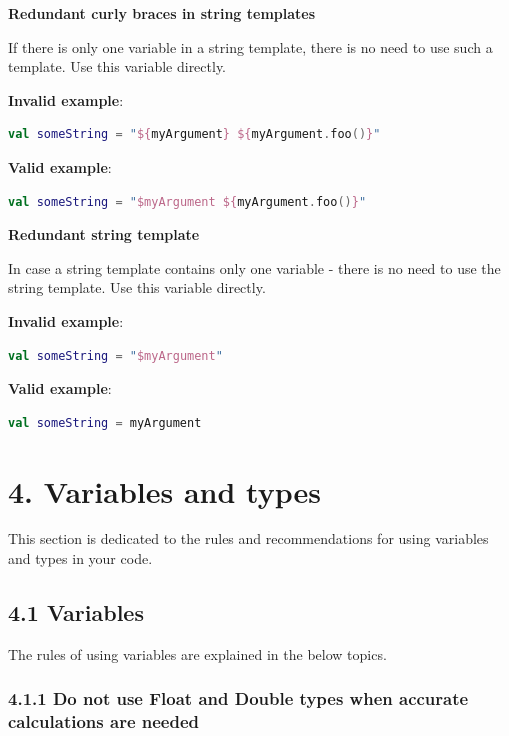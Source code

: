 {{{{\textbf{Redundant curly braces in string templates}



If there is only one variable in a string template, there is no need to use such a template. Use this variable directly.

\textbf{Invalid example}:

\begin{lstlisting}[language=Kotlin]
val someString = "${myArgument} ${myArgument.foo()}"
\end{lstlisting}


\textbf{Valid example}:

\begin{lstlisting}[language=Kotlin]
val someString = "$myArgument ${myArgument.foo()}"
\end{lstlisting}


\textbf{Redundant string template}



In case a string template contains only one variable - there is no need to use the string template. Use this variable directly.



\textbf{Invalid example}:

\begin{lstlisting}[language=Kotlin]
val someString = "$myArgument"
\end{lstlisting}


\textbf{Valid example}:

\begin{lstlisting}[language=Kotlin]
val someString = myArgument
\end{lstlisting}
\section*{\textbf{4. Variables and types}}

This section is dedicated to the rules and recommendations for using variables and types in your code.

\subsection*{\textbf{4.1 Variables}}

The rules of using variables are explained in the below topics.

\subsubsection*{\textbf{4.1.1 Do not use Float and Double types when accurate calculations are needed}}
\leavevmode\newline

}}}}
